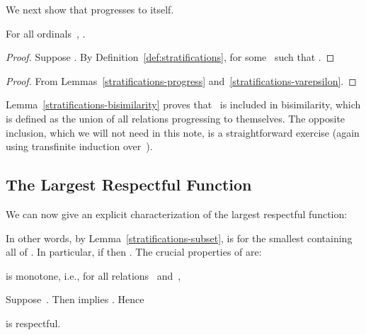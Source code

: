 \documentclass{CSML}
\theoremstyle{definition}
\begin{document}
We next show that  progresses to itself.

\begin{lem}
\label{stratifications-progress}
For all ordinals~, .
\end{lem}

\begin{proof}
Suppose .  By
Definition~\ref{def:stratifications},  for some~ such
that .
\end{proof}

\begin{lem}
\label{stratifications-bisimilarity}

\end{lem}

\begin{proof}
From Lemmas~\ref{stratifications-progress}
and~\ref{stratifications-varepsilon}.
\end{proof}

Lemma~\ref{stratifications-bisimilarity} proves
that~ is included in bisimilarity, which is
defined as the union of all relations progressing to themselves.  The
opposite inclusion, which we will not need in this note, is a
straightforward exercise (again using transfinite induction
over~).

\subsection{The Largest Respectful Function}

We can now give an explicit characterization of the largest respectful
function:

\begin{defi}[]
\label{definition-LRF}

\end{defi}

In other words, by Lemma~\ref{stratifications-subset},  is
 for the smallest  containing all of . In
particular, if  then . The crucial properties of  are:

\begin{lem}
\label{monotone}
 is monotone, i.e., for all relations~ and~, 
\end{lem}

\proof
Suppose~.  Then 
implies .  Hence 
\newpage

\begin{thm}
\label{lrf-is-respectful}
 is respectful.
\end{thm}
\end{document}
